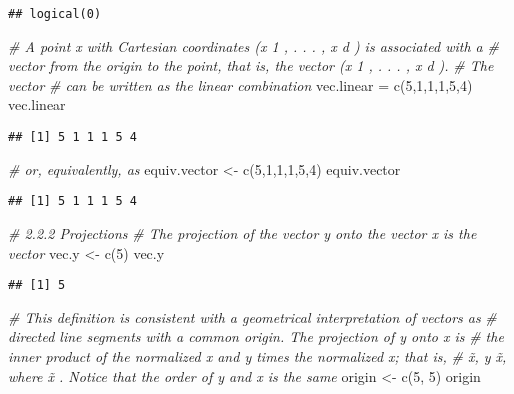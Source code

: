 \documentclass[
]{article}
\newenvironment{Shaded}{\begin{snugshade}}{\end{snugshade}}
\newcommand{\CommentTok}[1]{\textcolor[rgb]{0.56,0.35,0.01}{\textit{#1}}}
\newcommand{\DecValTok}[1]{\textcolor[rgb]{0.00,0.00,0.81}{#1}}
\newcommand{\FunctionTok}[1]{\textcolor[rgb]{0.00,0.00,0.00}{#1}}
\newcommand{\NormalTok}[1]{#1}
\newcommand{\OtherTok}[1]{\textcolor[rgb]{0.56,0.35,0.01}{#1}}
\begin{document}
\begin{verbatim}
## logical(0)
\end{verbatim}

\begin{Shaded}
\begin{Highlighting}[]
\CommentTok{\# A point x with Cartesian coordinates (x 1 , . . . , x d ) is associated with a}
\CommentTok{\# vector from the origin to the point, that is, the vector (x 1 , . . . , x d ). }
\CommentTok{\# The vector}
\CommentTok{\# can be written as the linear combination}
\NormalTok{vec.linear }\OtherTok{=} \FunctionTok{c}\NormalTok{(}\DecValTok{5}\NormalTok{,}\DecValTok{1}\NormalTok{,}\DecValTok{1}\NormalTok{,}\DecValTok{1}\NormalTok{,}\DecValTok{5}\NormalTok{,}\DecValTok{4}\NormalTok{)}
\NormalTok{vec.linear}
\end{Highlighting}
\end{Shaded}

\begin{verbatim}
## [1] 5 1 1 1 5 4
\end{verbatim}

\begin{Shaded}
\begin{Highlighting}[]
\CommentTok{\# or, equivalently, as}
\NormalTok{equiv.vector }\OtherTok{\textless{}{-}} \FunctionTok{c}\NormalTok{(}\DecValTok{5}\NormalTok{,}\DecValTok{1}\NormalTok{,}\DecValTok{1}\NormalTok{,}\DecValTok{1}\NormalTok{,}\DecValTok{5}\NormalTok{,}\DecValTok{4}\NormalTok{)}
\NormalTok{equiv.vector}
\end{Highlighting}
\end{Shaded}

\begin{verbatim}
## [1] 5 1 1 1 5 4
\end{verbatim}

\begin{Shaded}
\begin{Highlighting}[]
\CommentTok{\# 2.2.2 Projections}
\CommentTok{\# The projection of the vector y onto the vector x is the vector}
\NormalTok{vec.y }\OtherTok{\textless{}{-}} \FunctionTok{c}\NormalTok{(}\DecValTok{5}\NormalTok{)}
\NormalTok{vec.y}
\end{Highlighting}
\end{Shaded}

\begin{verbatim}
## [1] 5
\end{verbatim}

\begin{Shaded}
\begin{Highlighting}[]
\CommentTok{\# This deﬁnition is consistent with a geometrical interpretation of vectors as}
\CommentTok{\# directed line segments with a common origin. The projection of y onto x is}
\CommentTok{\# the inner product of the normalized x and y times the normalized x; that is,}
\CommentTok{\# x̃, y x̃, where x̃ . Notice that the order of y and x is the same}
\NormalTok{origin }\OtherTok{\textless{}{-}} \FunctionTok{c}\NormalTok{(}\DecValTok{5}\NormalTok{, }\DecValTok{5}\NormalTok{)}
\NormalTok{origin}
\end{Highlighting}
\end{Shaded}
\end{document}
